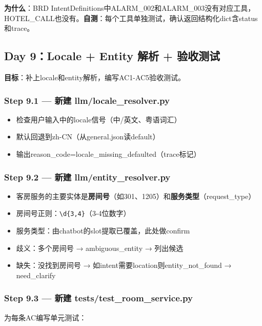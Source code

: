 \documentclass[12pt,a4paper]{ctexart}
\begin{document}
\textbf{为什么}：BRD IntentDefinitions中ALARM\_002和ALARM\_003没有对应工具，HOTEL\_CALL也没有。\textbf{自测}：每个工具单独测试，确认返回结构化dict含status和trace。

\newpage

\subsection{Day 9：Locale + Entity 解析 + 验收测试}

\textbf{目标}：补上locale和entity解析，编写AC1-AC5验收测试。

\subsubsection*{Step 9.1 — 新建 llm/locale\_resolver.py}

\begin{itemize}
    \item 检查用户输入中的locale信号（中/英文、粤语词汇）
    \item 默认回退到zh-CN（从general.json读default）
    \item 输出reason\_code=locale\_missing\_defaulted（trace标记）
\end{itemize}

\subsubsection*{Step 9.2 — 新建 llm/entity\_resolver.py}

\begin{itemize}
    \item 客房服务的主要实体是\textbf{房间号}（如301、1205）和\textbf{服务类型}（request\_type）
    \item 房间号正则：\texttt{\textbackslash d\{3,4\}}（3-4位数字）
    \item 服务类型：由chatbot的slot提取已覆盖，此处做confirm
    \item 歧义：多个房间号 → ambiguous\_entity → 列出候选
    \item 缺失：没找到房间号 → 如intent需要location则entity\_not\_found → need\_clarify
\end{itemize}

\subsubsection*{Step 9.3 — 新建 tests/test\_room\_service.py}

为每条AC编写单元测试：
\end{document}
